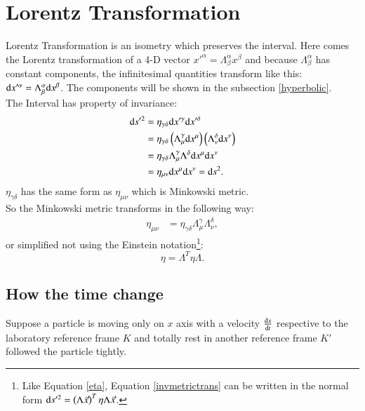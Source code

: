 \documentclass[openany,10pt]{book}
\theoremstyle{definition}
\theoremstyle{definition}
\theoremstyle{remark}
\begin{document}
\section{Lorentz Transformation}

 Lorentz Transformation is an isometry which preserves the interval.  Here comes the Lorentz transformation of a 4-D vector $x'^\alpha=\Lambda^\alpha_\beta x^\beta$ and because $\Lambda^\alpha_\beta$ has constant components, the infinitesimal quantities transform like this: ${\rm d}x'^\alpha=\Lambda^\alpha_\beta {\rm d}x^\beta$. The components will be shown in the subsection \ref{hyperbolic}.\\
 The Interval has property of invariance:
\begin{equation}\begin{aligned}\label{invmetrictrans}
 {\rm d}s'^2&=\eta_{\gamma \delta}{\rm d}x'^{\gamma}{\rm d}x'^{\delta}\\
&=\eta_{\gamma \delta}\left(\Lambda^\gamma_\mu{\rm d}x^{\mu}\right)\left(\Lambda^\delta_\nu{\rm d}x^{\nu}\right)\\
&=\eta_{\gamma \delta}\Lambda^\gamma_\mu\Lambda^\delta{\rm d}x^{\mu}{\rm d}x^{\nu}\\
&=\eta_{\mu \nu}{\rm d}x^{\mu}{\rm d}x^{\nu}={\rm d}s^2.\\
\end{aligned}
\end{equation}
$\eta_{\gamma \delta}$ has the same form as $\eta_{\mu\nu}$ which is Minkowski metric.\\
So the Minkowski metric transforms in the following way:
\begin{equation}\begin{aligned}
\eta_{\mu \nu}&=\eta_{\gamma \delta}\Lambda^\gamma_\mu \Lambda^\delta_\nu,
\end{aligned}
\end{equation}
or simplified not using the Einstein notation\footnote{Like Equation \ref{eta}, Equation \ref{invmetrictrans} can be written in the normal form  ${\rm d}s'^2=\left(\Lambda \vec x\right)^T\eta\Lambda\vec x$.}:
\begin{equation}
\eta=\Lambda^T\eta\Lambda.
\end{equation}

\subsection{How the time change}
Suppose a particle is moving only on $x$ axis with a velocity $\frac{{\rm d}x}{{\rm d}t}$ respective to the laboratory reference frame $K$ and totally rest in another reference frame $K'$ followed the particle tightly.
\end{document}
